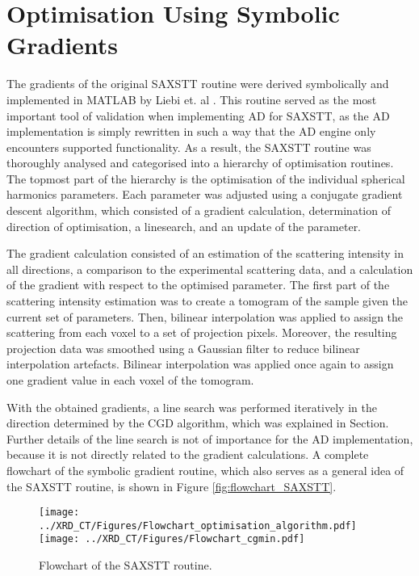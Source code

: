 \section{Optimisation Using Symbolic Gradients}
The gradients of the original SAXSTT routine were derived symbolically and implemented in MATLAB by Liebi et. al \cite{liebi2015nanostructure}.
This routine served as the most important tool of validation when implementing AD for SAXSTT,
as the AD implementation is simply rewritten in such a way that the AD engine only encounters supported functionality.
As a result, the SAXSTT routine was thoroughly analysed and categorised into a hierarchy of optimisation routines. %
The topmost part of the hierarchy is the optimisation of the individual spherical harmonics parameters.
Each parameter was adjusted using a conjugate gradient descent algorithm,
which consisted of a gradient calculation, determination of direction of optimisation, a linesearch, and an update of the parameter.

The gradient calculation consisted of an estimation of the scattering intensity in all directions, a comparison to the experimental scattering data,
and a calculation of the gradient with respect to the optimised parameter.
The first part of the scattering intensity estimation was to create a tomogram of the sample given the current set of parameters.
Then, bilinear interpolation was applied to assign the scattering from each voxel to a set of projection pixels.
Moreover, the resulting projection data was smoothed using a Gaussian filter to reduce bilinear interpolation artefacts.
Bilinear interpolation was applied once again to assign one gradient value in each voxel of the tomogram. %

With the obtained gradients, a line search was performed iteratively in the direction determined by the CGD algorithm, which was explained in Section. %
Further details of the line search is not of importance for the AD implementation, because it is not directly related to the gradient calculations.
A complete flowchart of the symbolic gradient routine, which also serves as a general idea of the SAXSTT routine, is shown in Figure \ref{fig:flowchart_SAXSTT}.

\begin{figure}
    \centering
    \texttt{[image: ../XRD\_CT/Figures/Flowchart\_optimisation\_algorithm.pdf]}
    \texttt{[image: ../XRD\_CT/Figures/Flowchart\_cgmin.pdf]}
    \caption{Flowchart of the SAXSTT routine.}
    \label{fig:flowchart_optimisation}
\end{figure}

